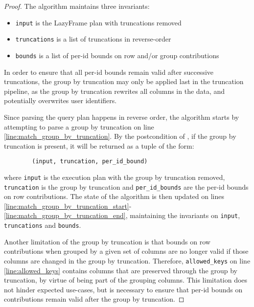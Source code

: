 \documentclass{article}
\begin{document}
\begin{proof}

    The algorithm maintains three invariants:
    \begin{itemize}
        \item \texttt{input} is the LazyFrame plan with truncations removed
        \item \texttt{truncations} is a list of truncations in reverse-order
        \item \texttt{bounds} is a list of per-id bounds on row and/or group contributions
    \end{itemize}

    In order to ensure that all per-id bounds remain valid after successive truncations,
    the group by truncation may only be applied last in the truncation pipeline,
    as the group by truncation rewrites all columns in the data,
    and potentially overwrites user identifiers.

    Since parsing the query plan happens in reverse order,
    the algorithm starts by attempting to parse a group by truncation on line \ref{line:match_group_by_truncation}.
    By the postcondition of ,
    if the group by truncation is present, it will be returned as a tuple of the form:
    \begin{lstlisting}
        (input, truncation, per_id_bound)
    \end{lstlisting}
    where \texttt{input} is the execution plan with the group by truncation removed,
    \texttt{truncation} is the group by truncation and \texttt{per\_id\_bounds} are the per-id bounds on row contributions.
    The state of the algorithm is then updated on lines \ref{line:match_group_by_truncation_start}-\ref{line:match_group_by_truncation_end},
    maintaining the invariants on \texttt{input}, \texttt{truncations} and \texttt{bounds}.

    Another limitation of the group by truncation is that bounds on row contributions when grouped by a given set of columns
    are no longer valid if those columns are changed in the group by truncation.
    Therefore, \texttt{allowed\_keys} on line \ref{line:allowed_keys} contains columns that are preserved through the group by truncation,
    by virtue of being part of the grouping columns.
    This limitation does not hinder expected use-cases, but is necessary to ensure that per-id bounds on contributions remain valid after the group by truncation.


\end{proof}
\end{document}
